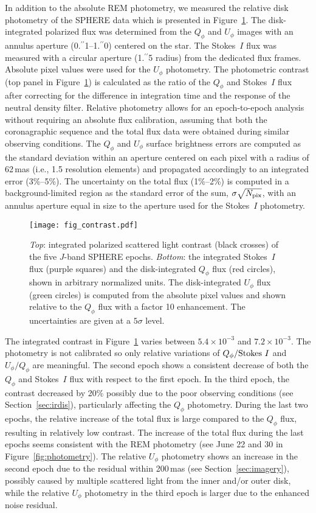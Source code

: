 \documentclass[twocolumn,tighten]{aastex61}
\newcommand{\ffarcs}{\mbox{\ensuremath{.\!\!^{\prime\prime}}}}
\begin{document}
In addition to the absolute REM photometry, we measured the relative disk photometry of the SPHERE data which is presented in Figure~\ref{fig:contrast}. The disk-integrated polarized flux was determined from the $Q_\phi$ and $U_\phi$ images with an annulus aperture (0\ffarcs1--1\ffarcs0) centered on the star. The Stokes~$I$ flux was measured with a circular aperture (1\ffarcs5 radius) from the dedicated flux frames. Absolute pixel values were used for the $U_\phi$ photometry. The photometric contrast (top panel in Figure~\ref{fig:contrast}) is calculated as the ratio of the $Q_\phi$ and Stokes~$I$ flux after correcting for the difference in integration time and the response of the neutral density filter. Relative photometry allows for an epoch-to-epoch analysis without requiring an absolute flux calibration, assuming that both the coronagraphic sequence and the total flux data were obtained during similar observing conditions. The $Q_\phi$ and $U_\phi$ surface brightness errors are computed as the standard deviation within an aperture centered on each pixel with a radius of 62\,mas (i.e., 1.5 resolution elements) and propagated accordingly to an integrated error (3\%--5\%). The uncertainty on the total flux (1\%--2\%) is computed in a background-limited region as the standard error of the sum, $\sigma\sqrt{N_{\rm pix}}$, with an annulus aperture equal in size to the aperture used for the Stokes~$I$ photometry.

\begin{figure}
\centering
\texttt{[image: fig\_contrast.pdf]}
\caption{\emph{Top}: integrated polarized scattered light contrast (black crosses) of the five $J$-band SPHERE epochs. \emph{Bottom}: the integrated Stokes~$I$ flux (purple squares) and the disk-integrated $Q_\phi$ flux (red circles), shown in arbitrary normalized units. The disk-integrated $U_\phi$ flux (green circles) is computed from the absolute pixel values and shown relative to the $Q_\phi$ flux with a factor 10 enhancement. The uncertainties are given at a $5\sigma$ level.\label{fig:contrast}}
\end{figure}

The integrated contrast in Figure~\ref{fig:contrast} varies between $5.4 \times 10^{-3}$ and $7.2 \times 10^{-3}$. The photometry is not calibrated so only relative variations of $Q_\phi/{\rm Stokes}~I$ and $U_\phi/Q_\phi$ are meaningful. The second epoch shows a consistent decrease of both the $Q_\phi$ and Stokes~$I$ flux with respect to the first epoch. In the third epoch, the contrast decreased by 20\% possibly due to the poor observing conditions (see Section~\ref{sec:irdis}), particularly affecting the $Q_\phi$ photometry. During the last two epochs, the relative increase of the total flux is large compared to the $Q_\phi$ flux, resulting in relatively low contrast. The increase of the total flux during the last epochs seems consistent with the REM photometry (see June 22 and 30 in Figure~\ref{fig:photometry}). The relative $U_\phi$ photometry shows an increase in the second epoch due to the residual within 200\,mas (see Section~\ref{sec:imagery}), possibly caused by multiple scattered light from the inner and/or outer disk, while the relative $U_\phi$ photometry in the third epoch is larger due to the enhanced noise residual.
\end{document}
